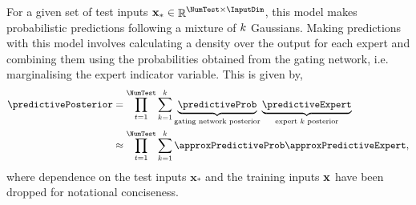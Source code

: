 \documentclass{mimosis-class/mimosis}
\numberwithin{equation}{chapter}
\DeclareMathOperator{\R}{\mathbb{R}}
\newcommand{\numData}{\ensuremath{t}}
\newcommand{\modeInd}{\ensuremath{k}}
\newcommand{\testInd}{\ensuremath{*}}
\newcommand{\ModeInd}{\ensuremath{\MakeUppercase{\modeInd}}}
\newcommand{\allData}[1]{\ensuremath{\MakeUppercase{#1}}}
\newcommand{\mode}[1]{\ensuremath{#1_{\modeInd}}}
\newcommand{\state}{\ensuremath{\mathbf{x}}}
\newcommand{\x}{\ensuremath{\mathbf{x}}}
\newcommand{\y}{\ensuremath{y}}
\newcommand{\allInput}{\ensuremath{\allData{\x}}}
\newcommand{\allOutput}{\ensuremath{\allData{\y}}}
\newcommand{\modeVar}{\ensuremath{\alpha}}
\newcommand{\gatingFunc}{\ensuremath{h}}
\newcommand{\GatingFunc}{\ensuremath{\mathbf{\gatingFunc}}}
\newcommand{\latentFunc}{\ensuremath{f}}
\newcommand{\singleTest}[1]{\ensuremath{#1_{\testInd}}}
\newcommand{\testInput}{\ensuremath{\singleTest{\state}}}
\begin{document}
{\newcommand{\predictiveExpertLikelihood}{\ensuremath{p(\singleTestOutput \mid \mode{f}(\singleTestInput))}}
\newcommand{\predictiveGatingLikelihood}{\ensuremath{\Pr(\singleTestModeVarK \mid \GatingFunc(\singleTestInput))}}
\newcommand{\predictiveGatingLikelihoodBernoulli}{\ensuremath{\Pr(\modeVar_n^*=1 \mid \modei{\gatingFunc}{1}(\singleTestInput))}}

\renewcommand{\expertPosterior}{\ensuremath{p(\mode{\latentFunc}(\singleTestInput) \mid \allOutput)}}
\renewcommand{\gatingPosterior}{\ensuremath{p(\GatingFunc(\singleTestInput) \mid \allOutput)}}

\renewcommand{\expertVariationalPosterior}{\ensuremath{q(\mode{\latentFunc}(\singleTestInput))}}
\renewcommand{\gatingVariationalPosterior}{\ensuremath{q(\GatingFunc(\singleTestInput)}}
\renewcommand{\gatingVariationalPosteriorBernoulli}{\ensuremath{q(\modei{\gatingFunc}{1}(\singleTestInput))}}
For a given set of test inputs \(\testInput \in \R^{\NumTest \times \InputDim}\),
this model makes probabilistic predictions following
a mixture of \(\ModeInd\) Gaussians.
Making predictions with this model involves calculating a density over the output for each expert and combining
them using the probabilities obtained from the gating network, i.e. marginalising the expert indicator variable.
This is given by,
\begin{align} \label{eq-predictive-posterior}
\predictivePosterior &= \prod_{\numData=1}^{\NumTest} \sum_{\modeInd=1}^\ModeInd \underbrace{\predictiveProb}_{\text{gating network posterior}} \underbrace{\predictiveExpert}_{\text{expert } \ModeInd \text{ posterior}} \\
&\approx \prod_{\numData=1}^{\NumTest} \sum_{\modeInd=1}^\ModeInd \approxPredictiveProb \approxPredictiveExpert,
\end{align}
where dependence on the test inputs \(\testInput\) and the training inputs \(\allInput\) have been dropped for
notational conciseness.

}
\end{document}
